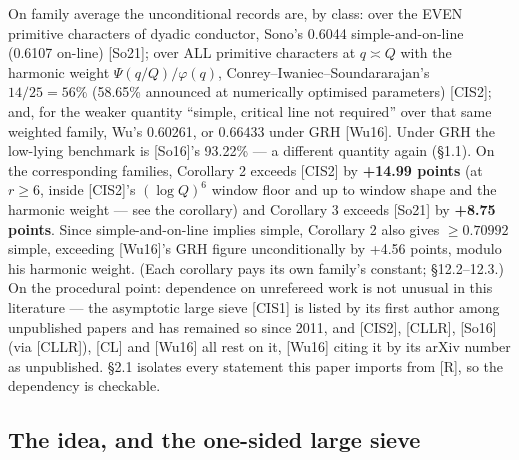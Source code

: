 \documentclass[11pt]{amsart}
\theoremstyle{plain}
\theoremstyle{remark}
\begin{document}
On family average the unconditional records are, by class: over the EVEN primitive
characters of dyadic conductor, Sono's 0.6044 simple-and-on-line (0.6107 on-line)
[So21]; over ALL primitive characters at $q \asymp Q$ with the harmonic weight
$\Psi(q/Q)/\varphi(q)$, Conrey--Iwaniec--Soundararajan's $14/25 = 56\%$ (58.65\%
announced at numerically optimised parameters) [CIS2]; and, for the weaker quantity
``simple, critical line not required'' over that same weighted family, Wu's 0.60261,
or 0.66433 under GRH [Wu16]. Under GRH the low-lying benchmark is [So16]'s 93.22\% ---
a different quantity again (\S1.1). On the corresponding families, Corollary 2 exceeds
[CIS2] by \textbf{+14.99 points} (at $r \ge 6$, inside [CIS2]'s $(\log Q)^{6}$ window
floor and up to window shape and the harmonic weight --- see the corollary) and
Corollary 3 exceeds [So21] by \textbf{+8.75 points}. Since simple-and-on-line implies
simple, Corollary 2 also gives $\ge 0.70992$ simple, exceeding [Wu16]'s GRH figure
unconditionally by +4.56 points, modulo his harmonic weight. (Each corollary pays its
own family's constant; \S12.2--12.3.) On the procedural point: dependence on unrefereed
work is not unusual in this literature --- the asymptotic large sieve [CIS1] is listed
by its first author among unpublished papers and has remained so since 2011, and
[CIS2], [CLLR], [So16] (via [CLLR]), [CL] and [Wu16] all rest on it, [Wu16] citing it
by its arXiv number as unpublished. \S2.1 isolates every statement this paper imports
from [R], so the dependency is checkable.

\subsection{The idea, and the one-sided large sieve}
\end{document}
